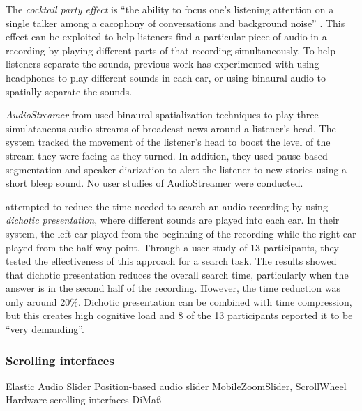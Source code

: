 The \textit{cocktail party effect} is ``the ability to focus one's listening attention on a single talker among a
cacophony of conversations and background noise'' \citep{Arons1992}.  This effect can be exploited to help listeners
find a particular piece of audio in a recording by playing different parts of that recording simultaneously. To help
listeners separate the sounds, previous work has experimented with using headphones to play different sounds in each
ear, or using binaural audio to spatially separate the sounds. 

\textit{AudioStreamer} from \citet{Schmandt1995} used binaural spatialization techniques to play three simulataneous
audio streams of broadcast news around a listener's head. The system tracked the movement of the listener's head to
boost the level of the stream they were facing as they turned.  In addition, they used pause-based segmentation and
speaker diarization to alert the listener to new stories using a short bleep sound. No user studies of AudioStreamer
were conducted.

\citet{Ranjan2006} attempted to reduce the time needed to search an audio recording by using \textit{dichotic
presentation}, where different sounds are played into each ear.  In their system, the left ear played from the
beginning of the recording while the right ear played from the half-way point. Through a user study of 13 participants,
they tested the effectiveness of this approach for a search task. The results showed that dichotic presentation reduces
the overall search time, particularly when the answer is in the second half of the recording. However, the time
reduction was only around 20\%.  Dichotic presentation can be combined with time compression, but this creates high
cognitive load and 8 of the 13 participants reported it to be ``very demanding''.




\subsubsection{Scrolling interfaces}
Elastic Audio Slider \citep{Hurst2004}
Position-based audio slider \citep{Hurst2006}
MobileZoomSlider, ScrollWheel \citep{Huerst2008}
Hardware scrolling interfaces \citep{Lee2007}
DiMa\ss \citep{Lee2006}

